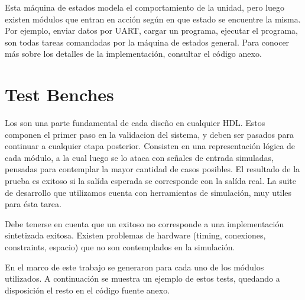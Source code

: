 \documentclass[12pt]{article}
\begin{document}
\noindent Esta máquina de estados modela el comportamiento de la unidad, pero luego existen módulos que entran en acción según en que estado se encuentre la misma. Por ejemplo, enviar datos por UART, cargar un programa, ejecutar el programa, son todas tareas comandadas por la máquina de estados general. Para conocer más sobre los detalles de la implementación, consultar el código anexo.

\section{Test Benches}

\noindent Los  son una parte fundamental de cada diseño en cualquier HDL. Estos componen el primer paso en la validacion del sistema, y deben ser pasados para continuar a cualquier etapa posterior. Consisten en una representación lógica de cada módulo, a la cual luego se lo ataca con señales de entrada simuladas, pensadas para contemplar la mayor cantidad de casos posibles. El resultado de la prueba es exitoso si la salída esperada se corresponde con la salída real. La suite de desarrollo que utilizamos cuenta con herramientas de simulación, muy utiles para ésta tarea.

Debe tenerse en cuenta que un  exitoso no corresponde a una implementación sintetizada exitosa. Existen problemas de hardware (timing, conexiones, constraints, espacio) que no son contemplados en la simulación.

En el marco de este trabajo se generaron  para cada uno de los módulos utilizados. A continuación se muestra un ejemplo de estos tests, quedando a disposición el resto en el código fuente anexo.
\end{document}

